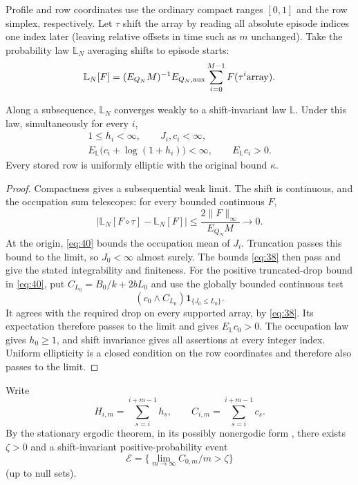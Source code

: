 Profile and row coordinates use the ordinary compact ranges \([0,1]\) and the row simplex, respectively. Let \(\tau\) shift the array by reading all absolute episode indices one index later (leaving relative offsets in time such as \(m\) unchanged). Take the probability law \(\mathbb L_N\) averaging shifts to episode starts:
\[
\mathbb L_N[F]=(E_{Q_N}M)^{-1} E_{Q_N,{\rm aux}}\sum_{i=0}^{M-1}F(\tau^i{\rm array}) .
\]
\begin{lemma}\label{profile-stationary}
Along a subsequence, \(\mathbb L_N\) converges weakly to a shift-invariant
law \(\mathbb L\). Under this law, simultaneously for every \(i\),
\[
\begin{gathered}
1\le h_i<\infty,\qquad J_i,c_i<\infty,\\
E_{\mathbb L}\bigl(c_i+\log(1+h_i)\bigr)<\infty,
\qquad E_{\mathbb L}c_i>0.
\end{gathered}
\]
Every stored row is uniformly elliptic with the original bound
\(\kappa\).
\end{lemma}

\begin{proof}
Compactness gives a subsequential weak limit. The shift is continuous,
and the occupation sum telescopes: for every bounded continuous \(F\),
\[
\left|\mathbb L_N[F\circ\tau]-\mathbb L_N[F]\right|
\le \frac{2\|F\|_\infty}{E_{Q_N}M}\longrightarrow0.
\]
At the origin, \eqref{eq:40} bounds the occupation mean of \(J_i\).
Truncation passes this bound to the limit, so \(J_0<\infty\) almost
surely. The bounds \eqref{eq:38} then pass and give the stated
integrability and finiteness. For the positive truncated-drop bound in
\eqref{eq:40}, put $C_{L_0}=B_0/k+2bL_0$ and use the globally
bounded continuous test
\[
 (c_0\wedge C_{L_0})\mathbf1_{\{J_0\le L_0\}}.
\]
It agrees with the required drop on every supported array, by
\eqref{eq:38}. Its expectation therefore passes to the limit and gives
$E_{\mathbb L}c_0>0$. The occupation law gives \(h_0\ge1\),
and shift invariance gives all assertions at every integer index.
Uniform ellipticity is a closed condition on the row coordinates and
therefore also passes to the limit.
\end{proof}

Write
\[
H_{i,m}=\sum_{s=i}^{i+m-1}h_s,\qquad C_{i,m}=\sum_{s=i}^{i+m-1}c_s .
\]
By the stationary ergodic theorem, in its possibly nonergodic form
\cite[Theorem~6.2.1]{Durrett2019}, there exists \(\zeta>0\) and a
shift-invariant positive-probability event
\[
\mathcal E=\{\lim_{m\to\infty}C_{0,m}/m>\zeta\}
\tag{41}\label{eq:41}
\]
(up to null sets).


